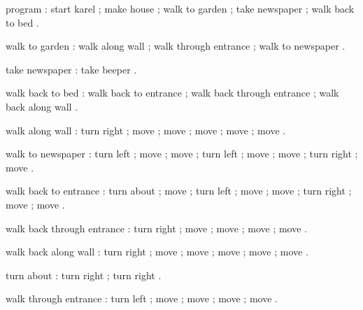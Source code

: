 \begin{elan}
program :
  start karel ;
  make house ;
  walk to garden ;
  take newspaper ;
  walk back to bed .
 
walk to garden :
  walk along wall ;
  walk through entrance ;
  walk to newspaper .
 
take newspaper :
  take beeper .
 
walk back to bed :
  walk back to entrance ;
  walk back through entrance ;
  walk back along wall .

walk along wall :
  turn right ;
  move ;
  move ;
  move ;
  move ;
  move .

walk to newspaper :
  turn left ;
  move ;
  move ;
  turn left ;
  move ;
  move ;
  turn right ;
  move .
 
walk back to entrance :
  turn about ;
  move ;
  turn left ;
  move ;
  move ;
  turn right ;
  move ;
  move .
 
walk back through entrance :
  turn right ;
  move ;
  move ;
  move ;
  move .
 
walk back along wall :
  turn right ;
  move ;
  move ;
  move ;
  move ;
  move .
 
turn about :
  turn right ;
  turn right .
 
walk through entrance :
  turn left ;
  move ;
  move ;
  move ;
  move .
\end{elan}

